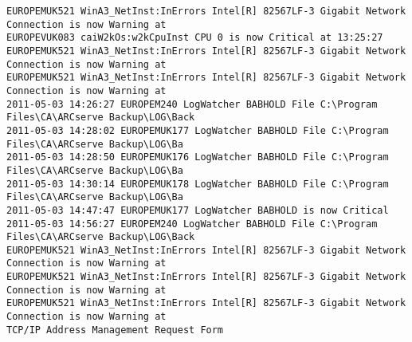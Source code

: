 \begin{lstlisting}
EUROPEMUK521 WinA3_NetInst:InErrors Intel[R] 82567LF-3 Gigabit Network Connection is now Warning at
EUROPEVUK083 caiW2kOs:w2kCpuInst CPU 0 is now Critical at 13:25:27
EUROPEMUK521 WinA3_NetInst:InErrors Intel[R] 82567LF-3 Gigabit Network Connection is now Warning at
EUROPEMUK521 WinA3_NetInst:InErrors Intel[R] 82567LF-3 Gigabit Network Connection is now Warning at
2011-05-03 14:26:27 EUROPEM240 LogWatcher BABHOLD File C:\Program Files\CA\ARCserve Backup\LOG\Back
2011-05-03 14:28:02 EUROPEMUK177 LogWatcher BABHOLD File C:\Program Files\CA\ARCserve Backup\LOG\Ba
2011-05-03 14:28:50 EUROPEMUK176 LogWatcher BABHOLD File C:\Program Files\CA\ARCserve Backup\LOG\Ba
2011-05-03 14:30:14 EUROPEMUK178 LogWatcher BABHOLD File C:\Program Files\CA\ARCserve Backup\LOG\Ba
2011-05-03 14:47:47 EUROPEMUK177 LogWatcher BABHOLD is now Critical
2011-05-03 14:56:27 EUROPEM240 LogWatcher BABHOLD File C:\Program Files\CA\ARCserve Backup\LOG\Back
EUROPEMUK521 WinA3_NetInst:InErrors Intel[R] 82567LF-3 Gigabit Network Connection is now Warning at
EUROPEMUK521 WinA3_NetInst:InErrors Intel[R] 82567LF-3 Gigabit Network Connection is now Warning at
EUROPEMUK521 WinA3_NetInst:InErrors Intel[R] 82567LF-3 Gigabit Network Connection is now Warning at
TCP/IP Address Management Request Form
\end{lstlisting}

